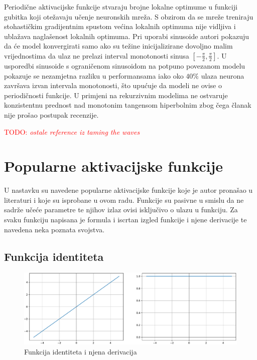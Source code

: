 \documentclass[times, utf8, numeric, diplomski]{fer}
\def\TODO#1{\noindent\textcolor{red}{TODO: \textit{#1}}\newline}
\def\todo#1{\TODO{#1}}
\begin{document}
Periodične aktivacijske funkcije stvaraju brojne lokalne optimume u funkciji gubitka koji otežavaju učenje neuronskih mreža. S obzirom da se mreže treniraju stohastičkim gradijentnim spustom većina lokalnih optimuma nije vidljiva i ublažava naglašenost lokalnih optimuma. Pri uporabi sinusoide autori pokazuju da će model konvergirati samo ako su težine inicijalizirane dovoljno malim vrijednostima da ulaz ne prelazi interval monotonosti sinusa $[-\frac{\pi}{2}, \frac{\pi}{2}]$. U usporedbi sinusoide s ograničenom sinusoidom na potpuno povezanom modelu pokazuje se nezamjetna razliku u performansama iako oko $40\%$ ulaza neurona završava izvan intervala monotonosti, što upućuje da modeli ne ovise o periodičnosti funkcije. U primjeni na rekurzivnim modelima ne ostvaruje konzistentnu prednost nad monotonim tangensom hiperbolnim zbog čega članak nije prošao postupak recenzije. \citep{taming_waves}

\todo{ostale reference iz taming the waves}

\section{Popularne aktivacijske funkcije}
U nastavku su navedene popularne aktivacijske funkcije koje je autor pronašao u literaturi i koje su isprobane u ovom radu. Funkcije su pasivne u smislu da ne sadrže učeće parametre te njihov izlaz ovisi isključivo o ulazu  u funkciju. Za svaku funkciju napisana je formula i iscrtan izgled funkcije i njene derivacije te navedena neka poznata svojstva.

\subsection{Funkcija identiteta}

\begin{figure}[H]
\includegraphics[width=\textwidth]{Identity.pdf}
\centering
\caption{Funkcija identiteta i njena derivacija}
\label{fig:identity}
\end{figure}
\end{document}
